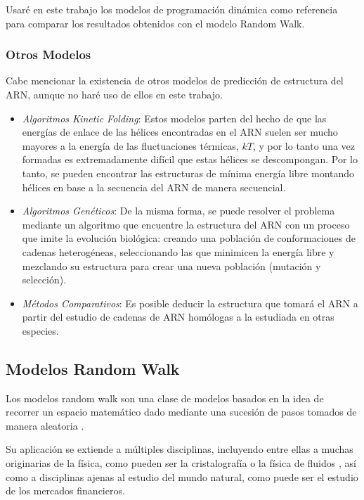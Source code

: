 \documentclass[a4paper,11pt,titlepage]{article}
\theoremstyle{definition}
\begin{document}

Usaré en este trabajo los modelos de programación dinámica como referencia para comparar los resultados obtenidos con el modelo Random Walk.

\subsubsection{Otros Modelos}\label{subsubsec:others}

Cabe mencionar la existencia de otros modelos de predicción de estructura del ARN, aunque no haré uso de ellos en este trabajo.

\begin{itemize}
    \item \textit{Algoritmos Kinetic Folding}: Estos modelos parten del hecho de que las energías de enlace de las hélices encontradas en el ARN suelen ser mucho mayores a la energía de las fluctuaciones térmicas, $kT$, y por lo tanto una vez formadas es extremadamente difícil que estas hélices se descompongan. Por lo tanto, se pueden encontrar las estructuras de mínima energía libre montando hélices en base a la secuencia del ARN de manera secuencial.
    \item \textit{Algoritmos Genéticos}: De la misma forma, se puede resolver el problema mediante un algoritmo que encuentre la estructura del ARN con un proceso que imite la evolución biológica: creando una población de conformaciones de cadenas heterogéneas, seleccionando las que minimicen la energía libre y mezclando su estructura para crear una nueva población (mutación y selección).
    \item \textit{Métodos Comparativos}: Es posible deducir la estructura que tomará el ARN a partir del estudio de cadenas de ARN homólogas a la estudiada en otras especies.
\end{itemize}


\subsection{Modelos Random Walk}\label{subsec:rndwalk}

Los modelos random walk son una clase de modelos basados en la idea de recorrer un espacio matemático dado mediante una sucesión de pasos tomados de manera aleatoria \cite{doyle} \cite{pearson}.

Su aplicación se extiende a múltiples disciplinas, incluyendo entre ellas a muchas originarias de la física, como pueden ser la cristalografía o la física de fluidos \cite{weiss}, así como a disciplinas ajenas al estudio del mundo natural, como puede ser el estudio de los mercados financieros\cite{blsch}.
\end{document}
